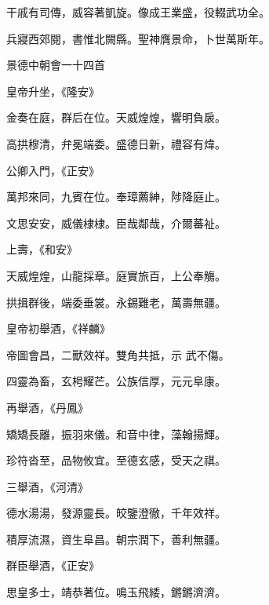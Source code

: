 \begin{pinyinscope}
 干戚有司傳，威容著凱旋。像成王業盛，役輟武功全。



 兵寢西郊閱，書惟北闕縣。聖神膺景命，卜世萬斯年。



 景德中朝會一十四首



 皇帝升坐，《隆安》



 金奏在庭，群后在位。天威煌煌，響明負扆。



 高拱穆清，弁冕端委。盛德日新，禮容有煒。



 公卿入門，《正安》



 萬邦來同，九賓在位。奉璋薦紳，陟降庭止。



 文思安安，威儀棣棣。臣哉鄰哉，介爾蕃祉。



 上壽，《和安》



 天威煌煌，山龍採章。庭實旅百，上公奉觴。



 拱揖群後，端委垂裳。永錫難老，萬壽無疆。



 皇帝初舉酒，《祥麟》



 帝圖會昌，二獸效祥。雙角共抵，示
 武不傷。



 四靈為畜，玄枵耀芒。公族信厚，元元阜康。



 再舉酒，《丹鳳》



 矯矯長離，振羽來儀。和音中律，藻翰揚輝。



 珍符沓至，品物攸宜。至德玄感，受天之祺。



 三舉酒，《河清》



 德水湯湯，發源靈長。皎鑒澄徹，千年效祥。



 積厚流濕，資生阜昌。朝宗潤下，善利無疆。



 群臣舉酒，《正安》



 思皇多士，靖恭著位。鳴玉飛緌，鏘鏘濟濟。




\end{pinyinscope}
